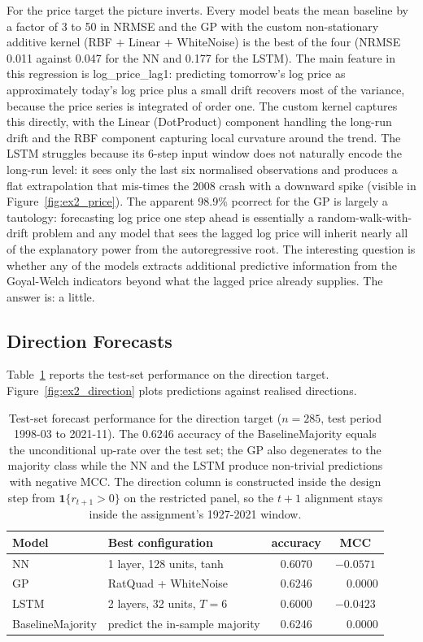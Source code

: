 \documentclass[12pt,a4paper]{article}
\newcommand{\probsub}[2]{\subsection{#2}}
\begin{document}
For the price target the picture inverts. Every model beats the mean baseline by a factor of 3 to 50 in NRMSE and the GP with the custom non-stationary additive kernel (RBF $+$ Linear $+$ WhiteNoise) is the best of the four (NRMSE 0.011 against 0.047 for the NN and 0.177 for the LSTM). The main feature in this regression is log\_price\_lag1: predicting tomorrow's log price as approximately today's log price plus a small drift recovers most of the variance, because the price series is integrated of order one. The custom kernel captures this directly, with the Linear (DotProduct) component handling the long-run drift and the RBF component capturing local curvature around the trend. The LSTM struggles because its 6-step input window does not naturally encode the long-run level: it sees only the last six normalised observations and produces a flat extrapolation that mis-times the 2008 crash with a downward spike (visible in Figure~\ref{fig:ex2_price}). The apparent 98.9\% pcorrect for the GP is largely a tautology: forecasting log price one step ahead is essentially a random-walk-with-drift problem and any model that sees the lagged log price will inherit nearly all of the explanatory power from the autoregressive root. The interesting question is whether any of the models extracts additional predictive information from the Goyal-Welch indicators beyond what the lagged price already supplies. The answer is: a little.

\probsub{2d}{Direction Forecasts}

Table~\ref{tab:ex2_direction} reports the test-set performance on the direction target. Figure~\ref{fig:ex2_direction} plots predictions against realised directions.

\begin{table}[H]
\centering
\small
\begin{tabular}{llcc}
\toprule
Model & Best configuration & accuracy & MCC \\
\midrule
NN                 & 1 layer, 128 units, tanh        & 0.6070 & $-0.0571$ \\
GP                 & RatQuad + WhiteNoise            & 0.6246 & $\phantom{-}0.0000$ \\
LSTM               & 2 layers, 32 units, $T{=}6$     & 0.6000 & $-0.0423$ \\
BaselineMajority   & predict the in-sample majority  & 0.6246 & $\phantom{-}0.0000$ \\
\bottomrule
\end{tabular}
\caption{Test-set forecast performance for the direction target ($n=285$, test period 1998-03 to 2021-11). The 0.6246 accuracy of the BaselineMajority equals the unconditional up-rate over the test set; the GP also degenerates to the majority class while the NN and the LSTM produce non-trivial predictions with negative MCC. The direction column is constructed inside the design step from $\mathbf{1}\{r_{t+1} > 0\}$ on the restricted panel, so the $t{+}1$ alignment stays inside the assignment's 1927-2021 window.}
\label{tab:ex2_direction}
\end{table}
\end{document}
